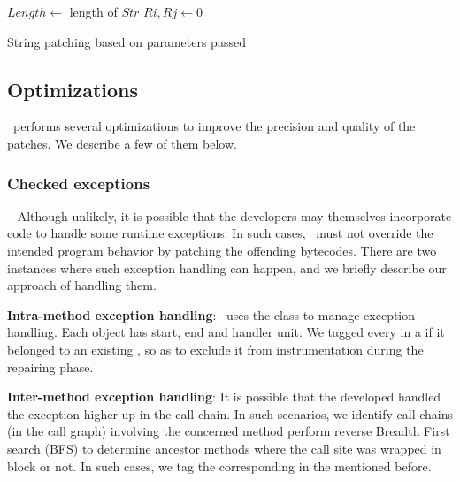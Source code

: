 \begin{algorithm}
\scriptsize
\DontPrintSemicolon
{}
\Begin
{
	$Length \longleftarrow$ length of $Str$\;
	 {
		$Ri, Rj \longleftarrow 0$\;
	} 	
}
\caption{String patching based on parameters passed}
\label{algo:stringPatchParametr}
\end{algorithm}

\subsection{Optimizations}
\label{subsec:optimizations}

\tool\ performs several optimizations to improve the precision and quality of
the patches. We describe a few of them below.

\subsubsection{Checked exceptions}
\label{subsubsec:callChainLookUp}
~\newline
Although unlikely, it is possible that the developers may themselves incorporate
code to handle some runtime exceptions. In such cases, \tool\ must not override
the intended program behavior by patching the offending bytecodes. There are two
instances where such exception handling can happen, and we briefly describe
our approach of handling them.

\begin{mylist}

 \item \textbf{Intra-method exception handling}: \soot\ uses the 
class to manage exception handling. Each  object has start, end and
handler unit.  We tagged every  in a  if it belonged
to an existing , so as to exclude it from instrumentation during the
repairing phase.

 \item \textbf{Inter-method exception handling}: It is possible that the
developed handled the exception higher up in the call chain. In such scenarios,
we identify call chains (in the call graph) involving the concerned method
perform reverse Breadth First search (BFS) to determine ancestor methods where
the call site was wrapped in  block or not. In such cases, we
tag the corresponding  in the  mentioned before.

\end{mylist}

